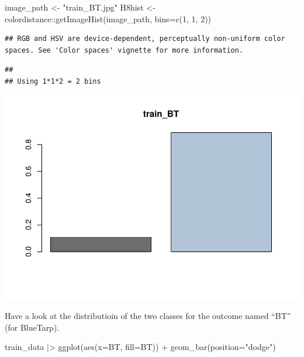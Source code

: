 \documentclass[
]{article}
\newenvironment{Shaded}{\begin{snugshade}}{\end{snugshade}}
\newcommand{\AttributeTok}[1]{\textcolor[rgb]{0.77,0.63,0.00}{#1}}
\newcommand{\DecValTok}[1]{\textcolor[rgb]{0.00,0.00,0.81}{#1}}
\newcommand{\FunctionTok}[1]{\textcolor[rgb]{0.00,0.00,0.00}{#1}}
\newcommand{\NormalTok}[1]{#1}
\newcommand{\OtherTok}[1]{\textcolor[rgb]{0.56,0.35,0.01}{#1}}
\newcommand{\SpecialCharTok}[1]{\textcolor[rgb]{0.00,0.00,0.00}{#1}}
\newcommand{\StringTok}[1]{\textcolor[rgb]{0.31,0.60,0.02}{#1}}
\begin{document}
\begin{Shaded}
\begin{Highlighting}[]
\NormalTok{image\_path }\OtherTok{\textless{}{-}} \StringTok{"train\_BT.jpg"}
\NormalTok{H8hist }\OtherTok{\textless{}{-}}\NormalTok{ colordistance}\SpecialCharTok{::}\FunctionTok{getImageHist}\NormalTok{(image\_path, }\AttributeTok{bins=}\FunctionTok{c}\NormalTok{(}\DecValTok{1}\NormalTok{, }\DecValTok{1}\NormalTok{, }\DecValTok{2}\NormalTok{))}
\end{Highlighting}
\end{Shaded}

\begin{verbatim}
## RGB and HSV are device-dependent, perceptually non-uniform color spaces. See 'Color spaces' vignette for more information.
\end{verbatim}

\begin{verbatim}
## 
## Using 1*1*2 = 2 bins
\end{verbatim}

\begin{center}\includegraphics{ProjectPart1_MERGED_files/figure-latex/unnamed-chunk-6-1} \end{center}

Have a look at the distributioin of the two classes for the outcome
named ``BT'' (for BlueTarp).

\begin{Shaded}
\begin{Highlighting}[]
\NormalTok{train\_data }\SpecialCharTok{|\textgreater{}} 
    \FunctionTok{ggplot}\NormalTok{(}\FunctionTok{aes}\NormalTok{(}\AttributeTok{x=}\NormalTok{BT, }\AttributeTok{fill=}\NormalTok{BT)) }\SpecialCharTok{+}
    \FunctionTok{geom\_bar}\NormalTok{(}\AttributeTok{position=}\StringTok{"dodge"}\NormalTok{)}
\end{Highlighting}
\end{Shaded}
\end{document}

